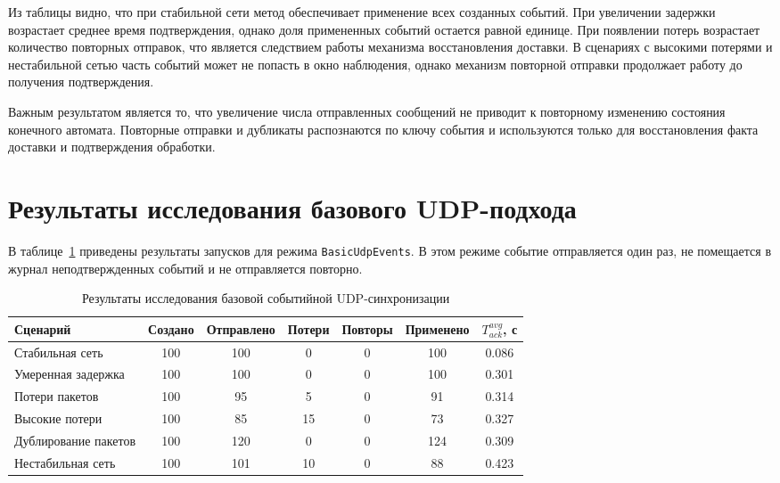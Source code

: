 Из таблицы видно, что при стабильной сети метод обеспечивает применение всех созданных событий. При увеличении задержки возрастает среднее время подтверждения, 
однако доля примененных событий остается равной единице. При появлении потерь возрастает количество повторных отправок, что является следствием работы механизма восстановления доставки. 
В сценариях с высокими потерями и нестабильной сетью часть событий может не попасть в окно наблюдения, однако механизм повторной отправки продолжает работу до получения подтверждения.

Важным результатом является то, что увеличение числа отправленных сообщений не приводит к повторному изменению состояния конечного автомата. 
Повторные отправки и дубликаты распознаются по ключу события и используются только для восстановления факта доставки и подтверждения обработки.

\section{Результаты исследования базового UDP-подхода}

В таблице~\ref{tab:research-basic-results} приведены результаты запусков для режима \texttt{BasicUdpEvents}. В этом режиме событие отправляется один раз, не помещается в журнал неподтвержденных событий и не отправляется повторно.

\begin{table}[H]
	\caption{Результаты исследования базовой событийной UDP-синхронизации}
	\label{tab:research-basic-results}
	\centering
	\small
	\renewcommand{\arraystretch}{1.2}
	\begin{tabular}{|p{3.2cm}|c|c|c|c|c|c|}
		\hline
		Сценарий & Создано & Отправлено & Потери & Повторы & Применено & $T_{ack}^{avg}$, с \\ \hline
		Стабильная сеть & 100 & 100 & 0 & 0 & 100 & 0.086 \\ \hline
		Умеренная задержка & 100 & 100 & 0 & 0 & 100 & 0.301 \\ \hline
		Потери пакетов & 100 & 95 & 5 & 0 & 91 & 0.314 \\ \hline
		Высокие потери & 100 & 85 & 15 & 0 & 73 & 0.327 \\ \hline
		Дублирование пакетов & 100 & 120 & 0 & 0 & 124 & 0.309 \\ \hline
		Нестабильная сеть & 100 & 101 & 10 & 0 & 88 & 0.423 \\ \hline
	\end{tabular}
\end{table}

